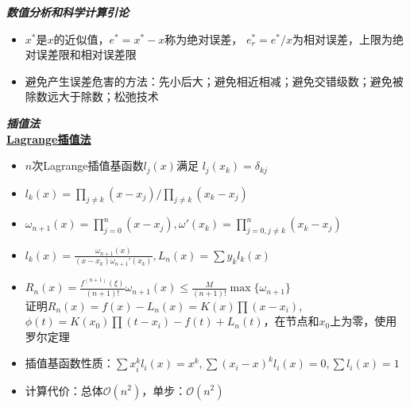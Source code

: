\documentclass[UTF8,a4paper,landscape,8pt]{paper}
\renewcommand{\subsection}[1]{{\small\textbf{\underline{#1}}}\\ }
\renewcommand{\section}[1]{{\normalsize\textbf{\emph{#1}}}\\ }
\newcommand{\List}[1]{\begin{itemize}[fullwidth,itemindent=0em] #1 \end{itemize}}
\begin{document}
\footnotesize
\begin{multicols}{4}
\section{数值分析和科学计算引论}
    \List{
    \item {$x^*$是$x$的近似值，$e^* = x^* - x$称为绝对误差，
    $e^*_r = e^* / x $为相对误差，上限为绝对误差限和相对误差限}
    \item {避免产生误差危害的方法：先小后大；避免相近相减；避免交错级数；避免被除数远大于除数；松弛技术}
    }
\section{插值法}
    \subsection{Lagrange插值法}
    \List{
        \item {$n$次Lagrange插值基函数$l_j(x)$满足
        $l_j(x_k) = \delta_{kj}$}
        \item {$l_k(x) =\prod_{j\ne k} (x-x_j) / \prod_{j\ne k} (x_k-x_j)$}
        \item {$\omega_{n+1}(x) = \displaystyle{\prod_{j=0}^n(x-x_j)}, \omega'(x_k)=\displaystyle{\prod_{j=0,j\ne k}^n(x_k-x_j)}$}
        \item {$l_k(x) = \frac{\omega_{n+1}(x)}{(x-x_k)\omega_{n+1}'(x_k)},L_n(x)=\sum y_kl_k(x)$}
        \item {$R_n(x) = \frac{f^{(n+1)}(\xi)}{(n+1)!}\omega_{n+1}(x) \le \frac{M}{(n+1)!}
        \max\{\omega_{n+1}\}$\\ 证明$R_n(x) = f(x)-L_n(x) = K(x)\prod(x-x_i)$,$\phi(t) = K(x_0)\prod(t-x_i) -f(t) + L_n(t)$，在节点和$x_0$上为零，使用罗尔定理}
        \item {插值基函数性质：$\sum x_i^k l_i(x) = x^k, \sum (x_i-x)^k l_i(x) = 0, \sum l_i(x) = 1$}
		\item {计算代价：总体$\mathcal O(n^2)$，单步：$\mathcal O(n^2)$}
    }

\end{multicols}
\end{document}
